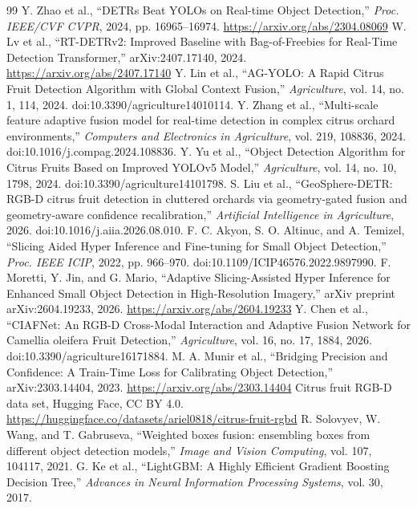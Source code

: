 \documentclass[11pt,a4paper]{article}
\begin{document}
\begin{thebibliography}{99}\small
{} Y. Zhao et al., “DETRs Beat YOLOs on Real-time Object Detection,” \emph{Proc. IEEE/CVF CVPR}, 2024, pp. 16965--16974. \url{https://arxiv.org/abs/2304.08069}
 W. Lv et al., “RT-DETRv2: Improved Baseline with Bag-of-Freebies for Real-Time Detection Transformer,” arXiv:2407.17140, 2024. \url{https://arxiv.org/abs/2407.17140}
 Y. Lin et al., “AG-YOLO: A Rapid Citrus Fruit Detection Algorithm with Global Context Fusion,” \emph{Agriculture}, vol. 14, no. 1, 114, 2024. doi:10.3390/agriculture14010114.
 Y. Zhang et al., “Multi-scale feature adaptive fusion model for real-time detection in complex citrus orchard environments,” \emph{Computers and Electronics in Agriculture}, vol. 219, 108836, 2024. doi:10.1016/j.compag.2024.108836.
 Y. Yu et al., “Object Detection Algorithm for Citrus Fruits Based on Improved YOLOv5 Model,” \emph{Agriculture}, vol. 14, no. 10, 1798, 2024. doi:10.3390/agriculture14101798.
 S. Liu et al., “GeoSphere-DETR: RGB-D citrus fruit detection in cluttered orchards via geometry-gated fusion and geometry-aware confidence recalibration,” \emph{Artificial Intelligence in Agriculture}, 2026. doi:10.1016/j.aiia.2026.08.010.
 F. C. Akyon, S. O. Altinuc, and A. Temizel, “Slicing Aided Hyper Inference and Fine-tuning for Small Object Detection,” \emph{Proc. IEEE ICIP}, 2022, pp. 966--970. doi:10.1109/ICIP46576.2022.9897990.
 F. Moretti, Y. Jin, and G. Mario, “Adaptive Slicing-Assisted Hyper Inference for Enhanced Small Object Detection in High-Resolution Imagery,” arXiv preprint arXiv:2604.19233, 2026. \url{https://arxiv.org/abs/2604.19233}
 Y. Chen et al., “CIAFNet: An RGB-D Cross-Modal Interaction and Adaptive Fusion Network for Camellia oleifera Fruit Detection,” \emph{Agriculture}, vol. 16, no. 17, 1884, 2026. doi:10.3390/agriculture16171884.
 M. A. Munir et al., “Bridging Precision and Confidence: A Train-Time Loss for Calibrating Object Detection,” arXiv:2303.14404, 2023. \url{https://arxiv.org/abs/2303.14404}
 Citrus fruit RGB-D data set, Hugging Face, CC BY 4.0. \url{https://huggingface.co/datasets/ariel0818/citrus-fruit-rgbd}
 R. Solovyev, W. Wang, and T. Gabruseva, “Weighted boxes fusion: ensembling boxes from different object detection models,” \emph{Image and Vision Computing}, vol. 107, 104117, 2021.
 G. Ke et al., “LightGBM: A Highly Efficient Gradient Boosting Decision Tree,” \emph{Advances in Neural Information Processing Systems}, vol. 30, 2017.

\end{thebibliography}
\end{document}
